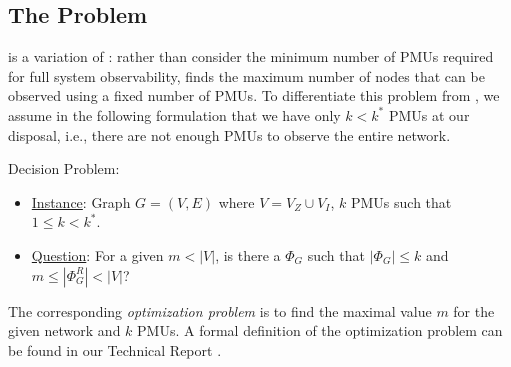 \subsection{The \maxinc Problem}
\label{subsec:maxinc}

\maxinc is a variation of \fulls: rather than consider the minimum number of PMUs required for full system observability,
\maxinc finds the maximum number of nodes that can be observed using a fixed number of PMUs.
To differentiate this problem from \fulls, we assume in the following formulation that we have only $k<k^*$ PMUs at our disposal, i.e., there are not enough PMUs to observe the entire network.




\maxinc Decision Problem:
\begin{itemize}
	\item \underline{Instance}: Graph $G=(V,E)$ where $V=V_Z \cup V_I$, $k$ PMUs such that $1 \leq k < k^*$.

	\item \underline{Question}: For a given $m< |V|$, is there a $\Phi_G$ such that $|\Phi_G| \leq k$ and $m \leq |\Phi^R_G| < |V|$?
\end{itemize}

The corresponding {\em optimization problem} is to find the maximal value $m$ for the given network and $k$ PMUs. A formal definition of the optimization problem can be found in 
our Technical Report \cite{Tech12}. 


